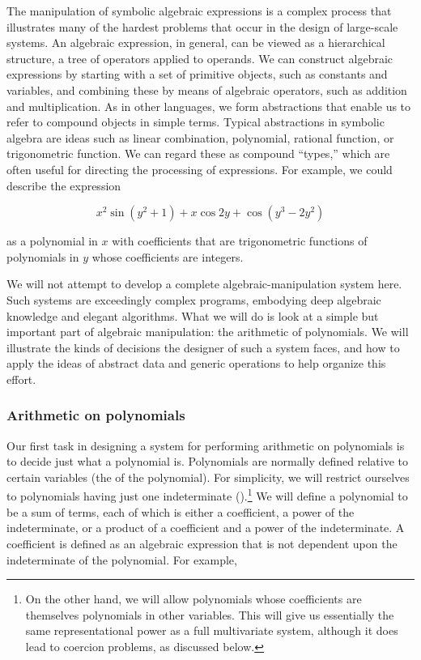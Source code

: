 The manipulation of symbolic algebraic expressions is a complex process that
illustrates many of the hardest problems that occur in the design of
large-scale systems.  An algebraic expression, in general, can be viewed as a
hierarchical structure, a tree of operators applied to operands.  We can
construct algebraic expressions by starting with a set of primitive objects,
such as constants and variables, and combining these by means of algebraic
operators, such as addition and multiplication.  As in other languages, we form
abstractions that enable us to refer to compound objects in simple terms.
Typical abstractions in symbolic algebra are ideas such as linear combination,
polynomial, rational function, or trigonometric function.  We can regard these
as compound ``types,'' which are often useful for directing the processing of
expressions.  For example, we could describe the expression

$$ x^2 \sin (y^2 + 1) + x \cos 2y + \cos(y^3 - 2y^2) $$

\noindent
as a polynomial in \( x \) with coefficients that are trigonometric functions of
polynomials in \( y \) whose coefficients are integers.

We will not attempt to develop a complete algebraic-manipulation system here.
Such systems are exceedingly complex programs, embodying deep algebraic
knowledge and elegant algorithms.  What we will do is look at a simple but
important part of algebraic manipulation: the arithmetic of polynomials.  We
will illustrate the kinds of decisions the designer of such a system faces, and
how to apply the ideas of abstract data and generic operations to help organize
this effort.

\subsubsection*{Arithmetic on polynomials}

Our first task in designing a system for performing arithmetic on polynomials
is to decide just what a polynomial is.  Polynomials are normally defined
relative to certain variables (the  of the polynomial).
For simplicity, we will restrict ourselves to polynomials having just one
indeterminate ().\footnote{On the other hand,
we will allow polynomials whose coefficients are themselves polynomials in
other variables.  This will give us essentially the same representational power
as a full multivariate system, although it does lead to coercion problems, as
discussed below.} We will define a polynomial to be a sum of terms, each of
which is either a coefficient, a power of the indeterminate, or a product of a
coefficient and a power of the indeterminate.  A coefficient is defined as an
algebraic expression that is not dependent upon the indeterminate of the
polynomial.  For example,

